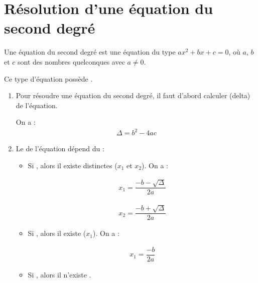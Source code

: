 \documentclass[12pt,a4paper]{article}
\date{}
\title{}
\begin{document}
{}

\section{Résolution d'une équation du second degré}

\begin{mydef}
	Une équation du second degré est une équation du type $ax^2+bx+c=0$, où $a$, $b$ et $c$ sont des nombres quelconques avec $a \neq 0$.
	
	Ce type d'équation possède .
\end{mydef}

\begin{mymeth}
	\begin{enumerate}
		\item Pour résoudre une équation du second degré, il faut d'abord calculer  (delta) de l'équation.
		
		On a : 
		\begin{align*}
			\Delta = b^2 - 4ac
		\end{align*}
		
		\item Le  de l'équation dépend du  :
		
		\begin{itemize}
		
			\item Si , alors il existe  distinctes ($x_1$ et $x_2$). On a :
			
			\begin{multicols}{2}
				\begin{align*}
					x_1=\dfrac{-b -\sqrt{\Delta}}{2a}
				\end{align*}
				
				\begin{align*}
					x_2=\dfrac{-b +\sqrt{\Delta}}{2a}
				\end{align*}
			\end{multicols}
			
			\item Si , alors il existe  ($x_1$). On a :
			
			\begin{align*}
				x_1=\dfrac{-b}{2a}
			\end{align*}
			
			\item Si , alors il n'existe . 
			
		\end{itemize} 
	\end{enumerate}
	
	
	
\end{mymeth}
\end{document}

